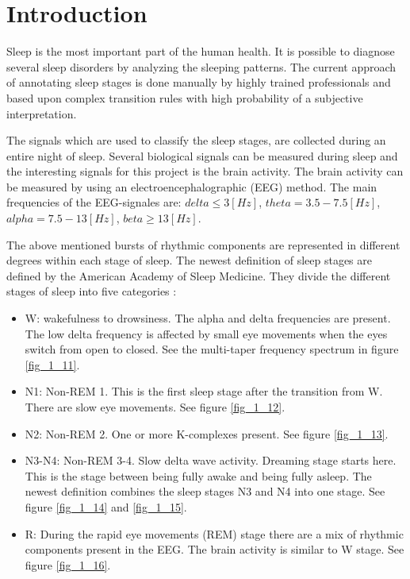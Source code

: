 \section{Introduction}
\label{sec:intro}

Sleep is the most important part of the human health. It is possible to diagnose several sleep disorders by analyzing the sleeping patterns.
The current approach of annotating sleep stages is done manually by highly trained professionals and based upon complex transition rules with high probability of a subjective interpretation.

The signals which are used to classify the sleep stages, are collected during an entire night of sleep. Several biological signals can be measured during sleep and the interesting signals for this project is the brain activity. The brain activity can be measured by using an electroencephalographic (EEG) method. 
The main frequencies of the EEG-signales are: $delta \le 3 \left[ Hz \right]$, 
$theta= 3.5-7.5 \left[ Hz \right]$,
$alpha= 7.5-13 \left[ Hz \right]$, 
$beta \ge 13 \left[ Hz \right]$.

The above mentioned bursts of rhythmic components are represented in different degrees within each stage of sleep.   
The newest definition of sleep stages are defined by the American Academy of Sleep Medicine. They divide the different stages of sleep into five categories \cite{main_ar, AASM}: 
\begin{itemize}
\item W: wakefulness to drowsiness. The alpha and delta frequencies are present. The low delta frequency is affected by small eye movements when the eyes switch from open to closed. See the multi-taper frequency spectrum in figure \ref{fig_1_11}.
\item N1: Non-REM 1. This is the first sleep stage after the transition from W. There are slow eye movements. See figure \ref{fig_1_12}.
\item N2: Non-REM 2. One or more K-complexes present. See figure \ref{fig_1_13}.
\item N3-N4: Non-REM 3-4. Slow delta wave activity. Dreaming stage starts here. This is the stage between being fully awake and being fully asleep. The newest definition combines the sleep stages N3 and N4 into one stage. See figure \ref{fig_1_14} and \ref{fig_1_15}.
\item R: During the rapid eye movements (REM) stage there are a mix of rhythmic components present in the EEG. The brain activity is similar to W stage. See figure \ref{fig_1_16}.
\end{itemize} 

